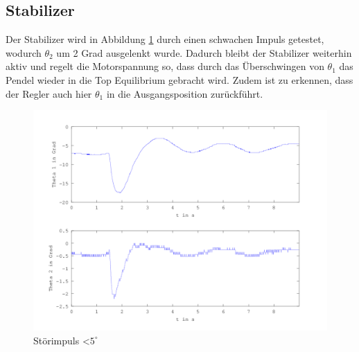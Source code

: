 \subsection{Stabilizer}

Der Stabilizer wird in Abbildung \ref{fig.Stabilisierer-Plot} durch einen schwachen Impuls getestet, wodurch $\theta_2$ um 2 Grad ausgelenkt wurde. Dadurch bleibt der Stabilizer weiterhin aktiv und regelt die Motorspannung so, dass durch das Überschwingen von $ \theta_1$ das Pendel wieder in die Top Equilibrium gebracht wird. Zudem ist zu erkennen, dass der Regler auch hier $ \theta_1$ in die Ausgangsposition zurückführt.

\begin{figure}[htbp]
	\centering
	\includegraphics[width=1.\textwidth]{Grafiken/Stab_lang.png}
	\caption{Störimpuls \textless $5^{\circ}$}
	\label{fig.Stabilisierer-Plot}
\end{figure}



